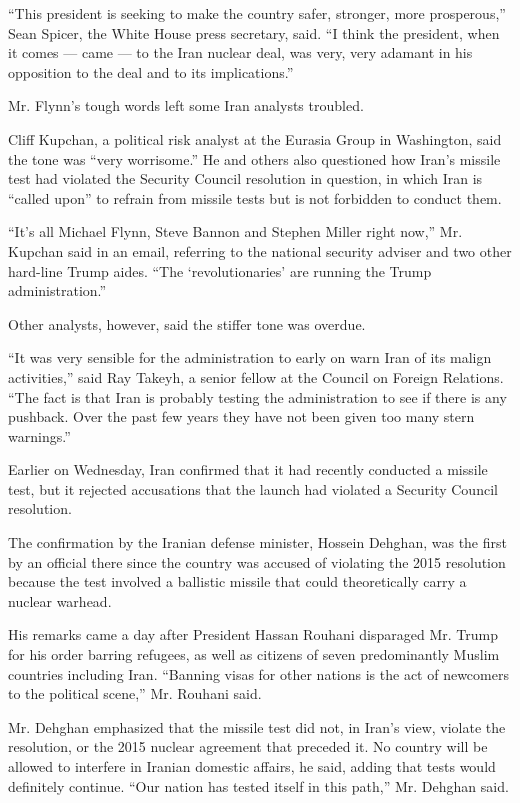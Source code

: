 ``This president is seeking to make the country safer, stronger, more
prosperous,'' Sean Spicer, the White House press secretary, said. ``I
think the president, when it comes --- came --- to the Iran nuclear
deal, was very, very adamant in his opposition to the deal and to its
implications.''

Mr. Flynn's tough words left some Iran analysts troubled.

Cliff Kupchan, a political risk analyst at the Eurasia Group in
Washington, said the tone was ``very worrisome.'' He and others also
questioned how Iran's missile test had violated the Security Council
resolution in question, in which Iran is ``called upon'' to refrain from
missile tests but is not forbidden to conduct them.

``It's all Michael Flynn, Steve Bannon and Stephen Miller right now,''
Mr. Kupchan said in an email, referring to the national security adviser
and two other hard-line Trump aides. ``The `revolutionaries' are running
the Trump administration.''

Other analysts, however, said the stiffer tone was overdue.

``It was very sensible for the administration to early on warn Iran of
its malign activities,'' said Ray Takeyh, a senior fellow at the Council
on Foreign Relations. ``The fact is that Iran is probably testing the
administration to see if there is any pushback. Over the past few years
they have not been given too many stern warnings.''

Earlier on Wednesday, Iran confirmed that it had recently conducted a
missile test, but it rejected accusations that the launch had violated a
Security Council resolution.

The confirmation by the Iranian defense minister, Hossein Dehghan, was
the first by an official there since the country was accused of
violating the 2015 resolution because the test involved a ballistic
missile that could theoretically carry a nuclear warhead.

His remarks came a day after President Hassan Rouhani disparaged Mr.
Trump for his order barring refugees, as well as citizens of seven
predominantly Muslim countries including Iran. ``Banning visas for other
nations is the act of newcomers to the political scene,'' Mr. Rouhani
said.

Mr. Dehghan emphasized that the missile test did not, in Iran's view,
violate the resolution, or the 2015 nuclear agreement that preceded it.
No country will be allowed to interfere in Iranian domestic affairs, he
said, adding that tests would definitely continue. ``Our nation has
tested itself in this path,'' Mr. Dehghan said.

